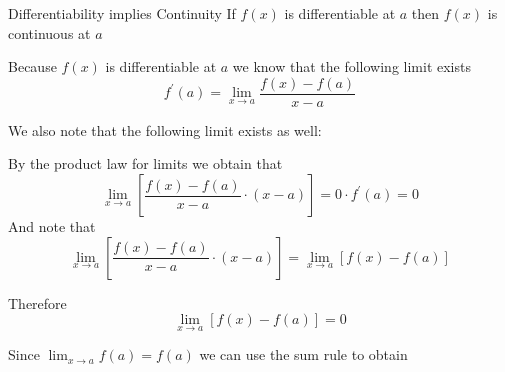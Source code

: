 \begin{theo*}{Differentiability implies Continuity}
  If $f\left(x\right)$ is differentiable at $a$ then $f\left(x\right)$ is continuous at $a$ 
     \item Because $f\left(x\right)$ is differentiable at $a$  we know that the following limit exists 
       \[
       f ^{ \prime }\left(a\right) = \lim_{x \to a } \frac{ f\left(x\right)  -  f\left(a\right)}{ x  -  a}
       \]
      \item We also note that the following limit exists as well:
      \item By the product law for limits we obtain that 
        \[
        \lim_{x \to a} \left[ \frac{f\left(x\right)  -  f\left(a\right)}{x  -  a}  \cdot  \left( x  -  a \right)  \right] = 0  \cdot  f ^{\prime}\left(a\right) = 0
        \]
        And note that  
        \[
          \lim_{x \to a} \left[ \frac{f\left(x\right)  -  f\left(a\right)}{x  -  a}  \cdot  \left( x  -  a \right)  \right] = \lim_{x \to a} \left[f\left(x\right)  -  f\left(a\right)  \right]
        \]
        \item Therefore
          \[
          \lim_{x \to a} \left[f\left(x\right)  -  f\left(a\right)  \right] = 0
          \]
        \item Since $\lim_{x \to a} f\left(a\right) = f\left(a\right)$ we can use the sum rule to obtain 
\end{theo*}




